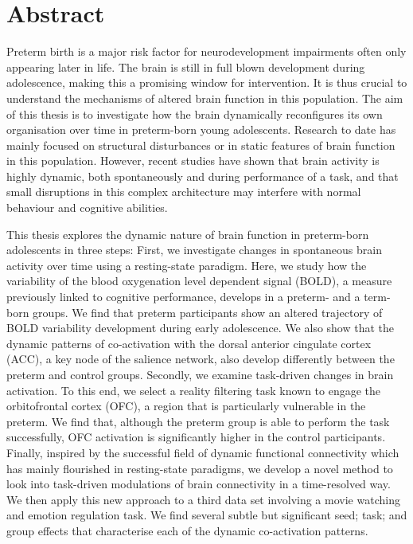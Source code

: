 

\cleardoublepage
\chapter*{Abstract}





Preterm birth is a major risk factor for neurodevelopment impairments often only appearing later in life. The brain is still in full blown development during adolescence, making this a promising window for intervention. It is thus crucial to understand the mechanisms of altered brain function in this population. The aim of this thesis is to investigate how the brain dynamically reconfigures its own organisation over time in preterm-born young adolescents. Research to date has mainly focused on structural disturbances or in static features of brain function in this population. However, recent studies have shown that brain activity is highly dynamic, both spontaneously and during performance of a task, and that small disruptions in this complex architecture may interfere with normal behaviour and cognitive abilities.   


\hspace{1cm} This thesis explores the dynamic nature of brain function in preterm-born adolescents in three steps: First, we investigate changes in spontaneous brain activity over time using a resting-state paradigm. Here, we study how the variability of the blood oxygenation level dependent signal (BOLD), a measure previously linked to cognitive performance, develops in a preterm- and a term-born groups. We find that preterm participants show an altered trajectory of BOLD variability development during early adolescence. We also show that the dynamic patterns of co-activation with the dorsal anterior cingulate cortex (ACC), a key node of the salience network, also develop differently between the preterm and control groups. Secondly, we examine task-driven changes in brain activation. To this end, we select a reality filtering task known to engage the orbitofrontal cortex (OFC), a region that is particularly vulnerable in the preterm. We find that, although the preterm group is able to perform the task successfully, OFC activation is significantly higher in the control participants. Finally, inspired by the successful field of dynamic functional connectivity which has mainly flourished in resting-state paradigms, we develop a novel method to look into task-driven modulations of brain connectivity in a time-resolved way. We then apply this new approach to a third data set involving a movie watching and emotion regulation task. We find several subtle but significant seed; task; and group effects that characterise each of the dynamic co-activation patterns.  

